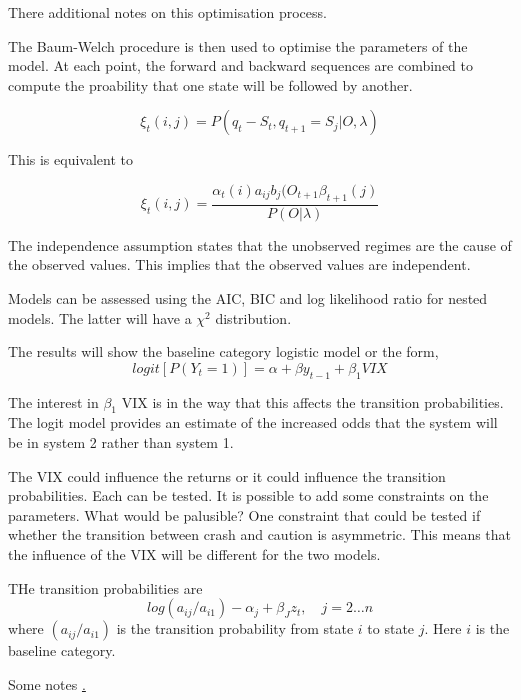 \documentclass[12pt, a4paper, oneside]{article} %
\begin{document}
There additional notes on this optimisation process. 

The Baum-Welch procedure is then used to optimise the parameters of the model.  At each point, the forward and backward sequences are combined to compute the proability that one state will be followed by another. 

\begin{equation}
\xi_t(i,j) = P(q_t - S_t, q_{t+1} = S_j| O, \lambda)
\end{equation}

This is equivalent to 

\begin{equation}
\xi_t(i,j) = \frac{\alpha_t(i)a_{ij}b_j(O_{t+1}\beta_{t+1}(j)}{P(O|\lambda)}
\end{equation}

The independence assumption states that the unobserved regimes are the cause of the observed values.  This implies that the observed values are independent. 

Models can be assessed using the AIC, BIC and log likelihood ratio for nested models.  The latter will have a $\chi^2$ distribution. 

The results will show the baseline category logistic model or the form, 
\begin{equation} 
logit[P(Y_t = 1)] = \alpha + \beta y_{t-1} + \beta_1 VIX
\end{equation}

The interest in $\beta_1$ VIX is in the way that this affects the transition probabilities.  The logit model provides an estimate of the increased odds that the system will be in system 2 rather than system 1.

The VIX could influence the returns or it could influence the transition probabilities.  Each can be tested. It is possible to add some constraints on the parameters.  What would be palusible? One constraint that could be tested if whether the transition between crash and caution is asymmetric.  This means that the influence of the VIX will be different for the two models.  

THe transition probabilities are
\begin{equation}
log(a_{ij}/a_{i1}) - \alpha_j +\beta_J z_t, \quad j = 2\dots n
\end{equation} 
where $(a_{ij}/a_{i1})$ is the transition probability from state $i$ to state $j$.  Here $i$ is the baseline category. 

Some notes \href{https://onlinecourses.science.psu.edu/stat504/node/174}.
\end{document}

